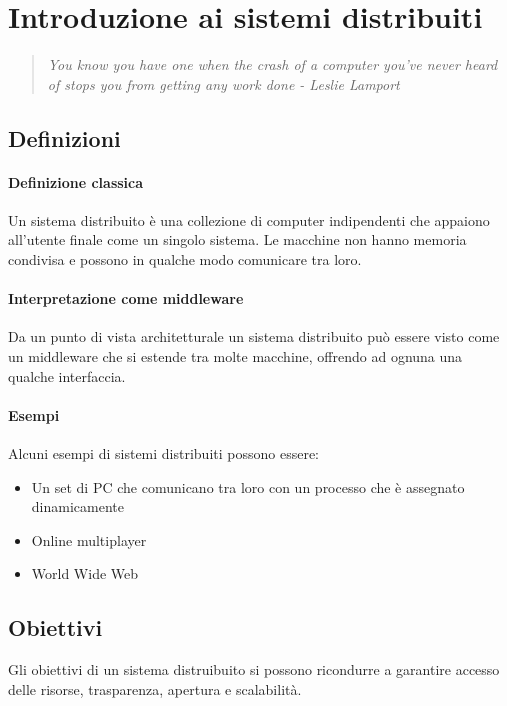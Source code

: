 \section{Introduzione ai sistemi distribuiti}

\begin{quote}
    \emph{You know you have one when the crash of a computer you've
    never heard of stops you from getting any work done - Leslie Lamport} 
\end{quote}

\subsection{Definizioni}

\paragraph{Definizione classica}
Un sistema distribuito è una collezione di computer indipendenti
che appaiono all'utente finale come un singolo sistema.
Le macchine non hanno memoria condivisa e possono in qualche modo 
comunicare tra loro.


\paragraph{Interpretazione come middleware}
Da un punto di vista architetturale un sistema distribuito può essere
 visto come un middleware che si estende tra molte macchine, offrendo 
ad ognuna una qualche interfaccia.

\paragraph{Esempi}
Alcuni esempi di sistemi distribuiti possono essere:
\begin{itemize}
    \item Un set di PC che comunicano tra loro con un 
    processo che è assegnato dinamicamente
    \item Online multiplayer
    \item World Wide Web 
\end{itemize}

\subsection{Obiettivi}
Gli obiettivi di un sistema distruibuito si possono ricondurre a garantire
accesso delle risorse, trasparenza, apertura e scalabilità.

